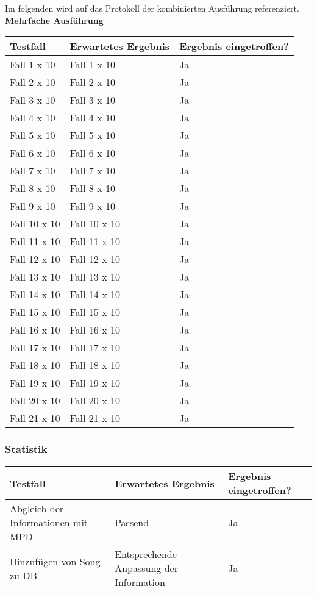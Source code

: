 \newpage
Im folgenden wird auf das Protokoll der kombinierten Ausführung referenziert.
\\
\textbf{Mehrfache Ausführung}
\\
\begin{tabularx}{\textwidth}{|X|X|l|}
    \hline
    \textbf{Testfall} & \textbf{Erwartetes Ergebnis} & \textbf{Ergebnis eingetroffen?}\\
    \hline
    Fall 1 x 10 & Fall 1 x 10 & Ja\\
    \hline
    Fall 2 x 10 & Fall 2 x 10 & Ja\\
    \hline
    Fall 3 x 10 & Fall 3 x 10 & Ja\\
    \hline
    Fall 4 x 10 & Fall 4 x 10 & Ja\\
    \hline
    Fall 5 x 10 & Fall 5 x 10 & Ja\\
    \hline
    Fall 6 x 10 & Fall 6 x 10 & Ja\\
    \hline
    Fall 7 x 10 & Fall 7 x 10 & Ja\\
    \hline
    Fall 8 x 10 & Fall 8 x 10 & Ja\\
    \hline
    Fall 9 x 10 & Fall 9 x 10 & Ja\\
    \hline
    Fall 10 x 10 & Fall 10 x 10 & Ja\\
    \hline
    Fall 11 x 10 & Fall 11 x 10 & Ja\\
    \hline
    Fall 12 x 10 & Fall 12 x 10 & Ja\\
    \hline
    Fall 13 x 10 & Fall 13 x 10 & Ja\\
    \hline
    Fall 14 x 10 & Fall 14 x 10 & Ja\\
    \hline
    Fall 15 x 10 & Fall 15 x 10 & Ja\\
    \hline
    Fall 16 x 10 & Fall 16 x 10 & Ja\\
    \hline
    Fall 17 x 10 & Fall 17 x 10 & Ja\\
    \hline
    Fall 18 x 10 & Fall 18 x 10 & Ja\\
    \hline
    Fall 19 x 10 & Fall 19 x 10 & Ja\\
    \hline
    Fall 20 x 10 & Fall 20 x 10 & Ja\\
    \hline
    Fall 21 x 10 & Fall 21 x 10 & Ja\\
    \hline
\end{tabularx}

\newpage
\subsubsection{Statistik}
\begin{tabularx}{\textwidth}{|X|X|l|}
    \hline
    \textbf{Testfall} & \textbf{Erwartetes Ergebnis} & \textbf{Ergebnis eingetroffen?}\\
    \hline
    Abgleich der Informationen mit MPD & Passend & Ja \\
    \hline
    Hinzufügen von Song zu DB & Entsprechende Anpassung der Information & Ja\\
    \hline
\end{tabularx}

